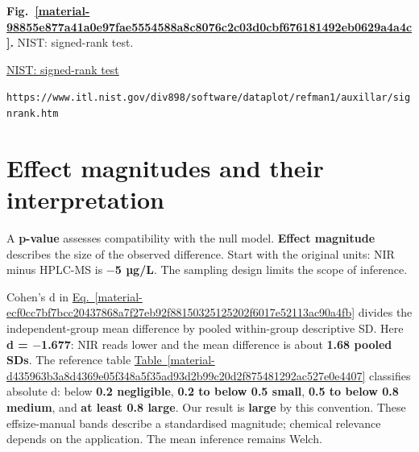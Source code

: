 \documentclass[11pt,a4paper]{article}
\begin{document}
\medskip

\par\medskip
\Needspace{10cm}
\label{material-98855e877a41a0e97fae5554588a8c8076c2c03d0cbf676181492eb0629a4a4c}
\noindent\textbf{Fig.~\ref*{material-98855e877a41a0e97fae5554588a8c8076c2c03d0cbf676181492eb0629a4a4c}.} NIST: signed-rank test.\par\nopagebreak
\noindent\href{https://www.itl.nist.gov/div898/software/dataplot/refman1/auxillar/signrank.htm}{NIST: signed-rank test}\par
\nolinkurl{https://www.itl.nist.gov/div898/software/dataplot/refman1/auxillar/signrank.htm}\par

\medskip

\clearpage
\section{Effect magnitudes and their interpretation}
A \textbf{p-value} assesses compatibility with the null model. \textbf{Effect magnitude} describes the size of the observed difference. Start with the original units: NIR minus HPLC-MS is \textbf{\ensuremath{-}5 µg/L}. The sampling design limits the scope of inference.


Cohen's d in \hyperref[material-ecf0cc7bf7bcc20437868a7f27eb92f88150325125202f6017e52113ac90a4fb]{Eq.~\ref*{material-ecf0cc7bf7bcc20437868a7f27eb92f88150325125202f6017e52113ac90a4fb}} divides the independent-group mean difference by pooled within-group descriptive SD. Here \textbf{d = \ensuremath{-}1.677}: NIR reads lower and the mean difference is about \textbf{1.68 pooled SDs}. The reference table \hyperref[material-d435963b3a8d4369e05f348a5f35ad93d2b99c20d2f875481292ac527e0e4407]{Table~\ref*{material-d435963b3a8d4369e05f348a5f35ad93d2b99c20d2f875481292ac527e0e4407}} classifies absolute d: below \textbf{0.2 negligible}, \textbf{0.2 to below 0.5 small}, \textbf{0.5 to below 0.8 medium}, and \textbf{at least 0.8 large}. Our result is \textbf{large} by this convention. These effsize-manual bands describe a standardised magnitude; chemical relevance depends on the application. The mean inference remains Welch.
\end{document}
